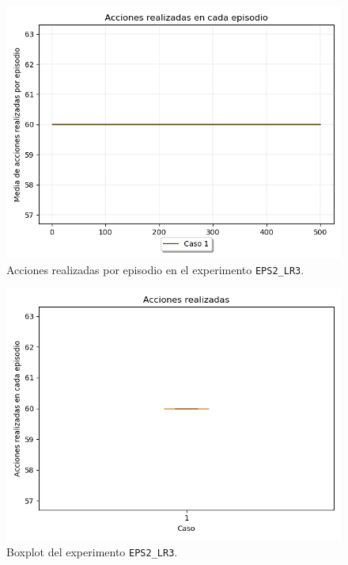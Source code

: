 \begin{figure}
    \centering
    \includegraphics[scale=0.4]{cap5_experimentacion/images/dim5_lr0.001_ep0.2_acciones.png}
   \caption{Acciones realizadas por episodio en el experimento \texttt{EPS2\_LR3}.}
    \label{fig:dim5_lr0.1_ep0.2_acciones}
\end{figure}

\begin{figure}
    \centering
    \includegraphics[scale=0.4]{cap5_experimentacion/images/dim5_lr0.001_ep0.2_boxplot.png}
    \caption{Boxplot del experimento \texttt{EPS2\_LR3}.}
    \label{fig:dim5_lr0.1_ep0.2_boxplot}
\end{figure}

